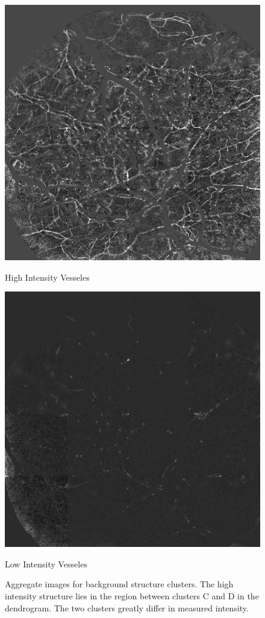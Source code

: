 \documentclass[10pt]{article}
\begin{document}
\begin{figure}[h]
    \centering

    \begin{minipage}{0.49\textwidth}
      \centering
      \includegraphics[width=\textwidth]{figs/vessels_DC.png}
      \caption*{High Intensity Vesseles}
    \end{minipage}
    \begin{minipage}{0.49\textwidth}
      \centering
      \includegraphics[width=\textwidth]{figs/remaining_vesseles.png}
      \caption*{Low Intensity Vesseles}
    \end{minipage}
    \caption{\footnotesize Aggregate images for background structure clusters. The high intensity structure lies in the region between clusters C and D in the dendrogram. The two clusters greatly differ in measured intensity.}
    \label{fig:clusterdepths}
\end{figure}
\end{document}
